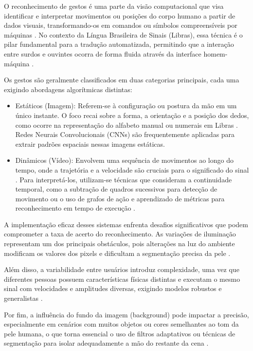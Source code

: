 \documentclass[
    12pt,                %
    openright,           %
    oneside,             %
    a4paper,             %
    english,             %
    brazil               %
]{abntex2}
\begin{document}
O reconhecimento de gestos é uma parte da visão computacional que visa identificar e interpretar movimentos ou posições do corpo humano a partir de dados visuais, transformando-os em comandos ou símbolos compreensíveis por máquinas \cite{Silva2017}. No contexto da Língua Brasileira de Sinais (Libras), essa técnica é o pilar fundamental para a tradução automatizada, permitindo que a interação entre surdos e ouvintes ocorra de forma fluida através da interface homem-máquina \cite{Bittencourt2002}.

Os gestos são geralmente classificados em duas categorias principais, cada uma exigindo abordagens algorítmicas distintas:
\begin{itemize}
    \item Estáticos (Imagem): Referem-se à configuração ou postura da mão em um único instante. O foco recai sobre a forma, a orientação e a posição dos dedos, como ocorre na representação do alfabeto manual ou numerais em Libras \cite{PintoJunior2019}. Redes Neurais Convolucionais (CNNs) são frequentemente aplicadas para extrair padrões espaciais nessas imagens estáticas.
    \item Dinâmicos (Vídeo): Envolvem uma sequência de movimentos ao longo do tempo, onde a trajetória e a velocidade são cruciais para o significado do sinal \cite{Silva2017}. Para interpretá-los, utilizam-se técnicas que consideram a continuidade temporal, como a subtração de quadros sucessivos para detecção de movimento ou o uso de grafos de ação e aprendizado de métricas para reconhecimento em tempo de execução \cite{Monteiro2016}.
\end{itemize}

A implementação eficaz desses sistemas enfrenta desafios significativos que podem comprometer a taxa de acerto do reconhecimento. As variações de iluminação representam um dos principais obstáculos, pois alterações na luz do ambiente modificam os valores dos pixels e dificultam a segmentação precisa da pele \cite{Bittencourt2002}. 

Além disso, a variabilidade entre usuários introduz complexidade, uma vez que diferentes pessoas possuem características físicas distintas e executam o mesmo sinal com velocidades e amplitudes diversas, exigindo modelos robustos e generalistas \cite{Silva2017}. 

Por fim, a influência do fundo da imagem (background) pode impactar a precisão, especialmente em cenários com muitos objetos ou cores semelhantes ao tom da pele humana, o que torna essencial o uso de filtros adaptativos ou técnicas de segmentação para isolar adequadamente a mão do restante da cena \cite{Monteiro2016}.
\end{document}
